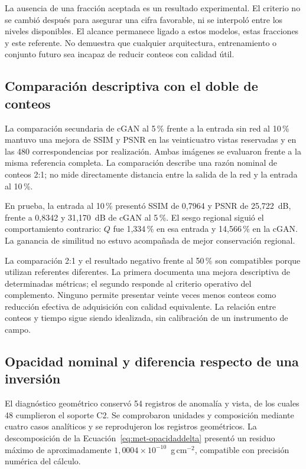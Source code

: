 La ausencia de una fracción aceptada es un resultado experimental. El criterio no se cambió después para asegurar una cifra favorable, ni se interpoló entre los niveles disponibles. El alcance permanece ligado a estos modelos, estas fracciones y este referente. No demuestra que cualquier arquitectura, entrenamiento o conjunto futuro sea incapaz de reducir conteos con calidad útil.

\subsection{Comparación descriptiva con el doble de conteos}
La comparación secundaria de cGAN al 5\,\% frente a la entrada sin red al 10\,\% mantuvo una mejora de SSIM y PSNR en las veinticuatro vistas reservadas y en las 480 correspondencias por realización. Ambas imágenes se evaluaron frente a la misma referencia completa. La comparación describe una razón nominal de conteos 2:1; no mide directamente distancia entre la salida de la red y la entrada al 10\,\%.

En prueba, la entrada al 10\,\% presentó SSIM de 0,7964 y PSNR de 25,722~dB, frente a 0,8342 y 31,170~dB de cGAN al 5\,\%. El sesgo regional siguió el comportamiento contrario: $Q$ fue 1,334\,\% en esa entrada y 14,566\,\% en la cGAN. La ganancia de similitud no estuvo acompañada de mejor conservación regional.

La comparación 2:1 y el resultado negativo frente al 50\,\% son compatibles porque utilizan referentes diferentes. La primera documenta una mejora descriptiva de determinadas métricas; el segundo responde al criterio operativo del complemento. Ninguno permite presentar veinte veces menos conteos como reducción efectiva de adquisición con calidad equivalente. La relación entre conteos y tiempo sigue siendo idealizada, sin calibración de un instrumento de campo.

\subsection{Opacidad nominal y diferencia respecto de una inversión}
El diagnóstico geométrico conservó 54 registros de anomalía y vista, de los cuales 48 cumplieron el soporte C2. Se comprobaron unidades y composición mediante cuatro casos analíticos y se reprodujeron los registros geométricos. La descomposición de la Ecuación~\eqref{eq:met-opacidaddelta} presentó un residuo máximo de aproximadamente $1{,}0004\times10^{-10}$~g\,cm$^{-2}$, compatible con precisión numérica del cálculo.

